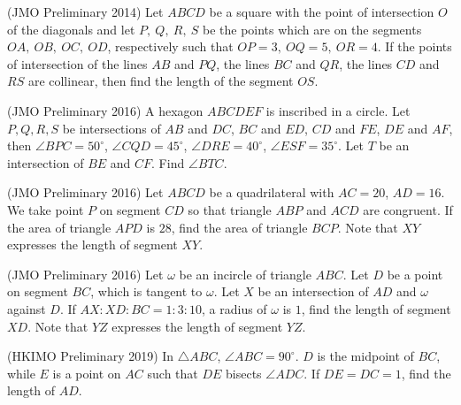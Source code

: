 \documentclass[12pt]{scrartcl}
\begin{document}
    \begin{soalbaru}
    (JMO Preliminary 2014) Let $ABCD$ be a square with the point of intersection $O$ of the diagonals and let $P,\ Q,\ R,\ S$ be the points which are on the segments $OA,\ OB,\ OC,\ OD$, respectively such that $OP=3,\ OQ=5,\ OR=4$. If the points of intersection of the lines $AB$ and $PQ$, the lines $BC$ and $QR$, the lines $CD$ and $RS$ are collinear, then find the length of the segment $OS$.
    \end{soalbaru}
    
    \begin{soalbaru}
    (JMO Preliminary 2016) A hexagon $ABCDEF$ is inscribed in a circle. Let $P, Q, R, S$ be intersections of $AB$ and $DC$, $BC$ and $ED$, $CD$ and $FE$, $DE$ and $AF$, then $\angle BPC=50^{\circ}$, $\angle CQD=45^{\circ}$, $\angle DRE=40^{\circ}$, $\angle ESF=35^{\circ}$. Let $T$ be an intersection of $BE$ and $CF$. Find $\angle BTC$.
    \end{soalbaru}
    
    \begin{soalbaru}
    (JMO Preliminary 2016) Let $ABCD$ be a quadrilateral with $AC=20$, $AD=16$. We take point $P$ on segment $CD$ so that triangle $ABP$ and $ACD$ are congruent. If the area of triangle $APD$ is $28$, find the area of triangle $BCP$. Note that $XY$ expresses the length of segment $XY$.
    \end{soalbaru}
    
    \begin{soalbaru}
    (JMO Preliminary 2016) Let $\omega$ be an incircle of triangle $ABC$. Let $D$ be a point on segment $BC$, which is tangent to $\omega$. Let $X$ be an intersection of $AD$ and $\omega$ against $D$. If $AX : XD : BC = 1 : 3 : 10$, a radius of $\omega$ is $1$, find the length of segment $XD$. Note that $YZ$ expresses the length of segment $YZ$.
    \end{soalbaru}
    
    \begin{soalbaru}
    (HKIMO Preliminary 2019) In $\triangle ABC$, $\angle ABC = 90^\circ$. $D$ is the midpoint of $BC$, while $E$ is a point on $AC$ such that $DE$ bisects $\angle ADC$. If $DE=DC=1$, find the length of $AD$. 
    \end{soalbaru}
    
\end{document}
